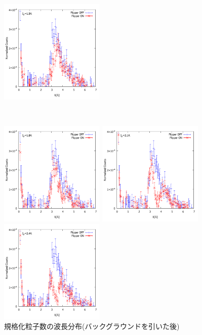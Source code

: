 \begin{figure}[h]
\begin{minipage}{0.33\hsize}
\end{minipage}
\begin{minipage}{0.33\hsize}
\includegraphics[width=5cm]{discussion/NC-BG/NormalizedCounts_b_15A.pdf}
\end{minipage}\\
\begin{minipage}{0.33\hsize}
\includegraphics[width=5cm]{discussion/NC-BG/NormalizedCounts_b_18A.pdf}
\end{minipage}
\begin{minipage}{0.33\hsize}
\includegraphics[width=5cm]{discussion/NC-BG/NormalizedCounts_b_21A.pdf}
\end{minipage}
\begin{minipage}{0.33\hsize}
\includegraphics[width=5cm]{discussion/NC-BG/NormalizedCounts_b_24A.pdf}
\end{minipage}
\caption{規格化粒子数の波長分布(バックグラウンドを引いた後)}\label{Discussion_fig_NC_b}
\end{figure}

